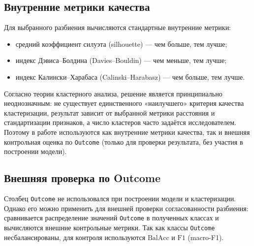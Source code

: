 \documentclass[a4paper, 14pt]{extarticle}
\begin{document}
\subsection{Внутренние метрики качества}
Для выбранного разбиения вычисляются стандартные внутренние метрики:
\begin{itemize}
  \item средний коэффициент силуэта (silhouette) --- чем больше, тем лучше;
  \item индекс Дэвиса--Болдина (Davies--Bouldin) --- чем меньше, тем лучше;
  \item индекс Калински--Харабаса (Calinski--Harabasz) --- чем больше, тем лучше.
\end{itemize}

\medskip
Согласно теории кластерного анализа, решение является принципиально неоднозначным: не существует единственного «наилучшего» критерия качества кластеризации, результат зависит от выбранной метрики расстояния и стандартизации признаков, а число кластеров часто задаётся исследователем. Поэтому в работе используются как внутренние метрики качества, так и внешняя контрольная оценка по \texttt{Outcome} (только для проверки результата, без участия в построении модели).

\subsection{Внешняя проверка по Outcome}
Столбец \texttt{Outcome} не использовался при построении модели и кластеризации. Однако его можно применить для внешней проверки согласованности разбиения: сравнивается распределение значений \texttt{Outcome} в полученных классах и вычисляются внешние контрольные метрики. Так как классы \texttt{Outcome} несбалансированы, для контроля используются \(\mathrm{BalAcc}\) и \(\mathrm{F1}\) (macro-F1).

\begin{table}[H]
\centering

\caption{Внешние контрольные метрики по \texttt{Outcome} (лучшее сопоставление меток кластеров и \texttt{Outcome})}
\end{table}
\end{document}
